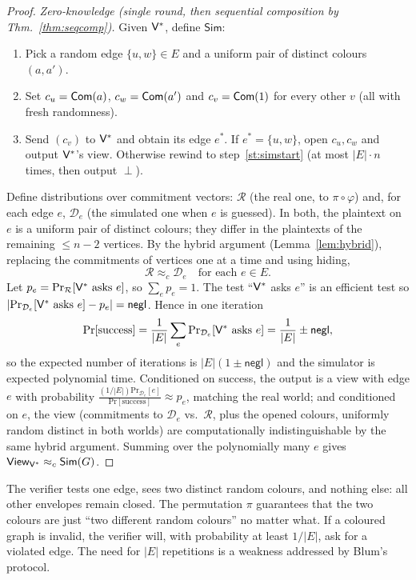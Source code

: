 \documentclass[11pt,a4paper]{report}
\theoremstyle{plain}
\theoremstyle{definition}
\theoremstyle{remark}
\newcommand{\negl}{\mathsf{negl}}
\renewcommand{\Pr}{\mathrm{Pr}}
\newcommand{\Sim}{\mathsf{Sim}}\newcommand{\Ext}{\mathsf{Ext}}
\newcommand{\view}{\mathsf{View}}
\begin{document}
\begin{proof}
\emph{Zero-knowledge (single round, then sequential composition by Thm.~\ref{thm:seqcomp}).} Given $\mathsf{V}^*$, define $\Sim$:
\begin{enumerate}
\item\label{st:simstart} Pick a random edge $\{u,w\}\in E$ and a uniform pair of distinct colours $(a,a')$.
\item Set $c_u=\mathsf{Com}(a)$, $c_w=\mathsf{Com}(a')$ and $c_v=\mathsf{Com}(1)$ for every other $v$ (all with fresh randomness).
\item Send $(c_v)$ to $\mathsf{V}^*$ and obtain its edge $e^*$. If $e^*=\{u,w\}$, open $c_u,c_w$ and output $\mathsf{V}^*$'s view. Otherwise rewind to step~\ref{st:simstart} (at most $|E|\cdot n$ times, then output $\perp$).
\end{enumerate}
Define distributions over commitment vectors: $\mathcal R$ (the real one, to $\pi\circ\varphi$) and, for each edge $e$, $\mathcal D_e$ (the simulated one when $e$ is guessed). In both, the plaintext on $e$ is a uniform pair of distinct colours; they differ in the plaintexts of the remaining $\le n-2$ vertices. By the hybrid argument (Lemma~\ref{lem:hybrid}), replacing the commitments of vertices one at a time and using hiding,
\[ \mathcal R\approx_c\mathcal D_e\quad\text{for each }e\in E. \]
Let $p_e=\Pr_{\mathcal R}[\Ver^*\text{ asks }e]$, so $\sum_ep_e=1$. The test ``$\mathsf{V}^*$ asks $e$'' is an efficient test so $|\Pr_{\mathcal D_e}[\Ver^*\text{ asks }e]-p_e|=\negl$. Hence in one iteration
\[
\Pr[\text{success}]=\frac1{|E|}\sum_e\Pr_{\mathcal D_e}[\Ver^*\text{ asks }e]=\frac1{|E|}\pm\negl,
\]
so the expected number of iterations is $|E|(1\pm\negl)$ and the simulator is expected polynomial time. Conditioned on success, the output is a view with edge $e$ with probability $\frac{(1/|E|)\Pr_{\mathcal D_e}[e]}{\Pr[\text{success}]}\approx p_e$, matching the real world; and conditioned on $e$, the view (commitments to $\mathcal D_e$ vs.\ $\mathcal R$, plus the opened colours, uniformly random distinct in both worlds) are computationally indistinguishable by the same hybrid argument. Summing over the polynomially many $e$ gives $\view_{\Ver^*}\approx_c\Sim(G)$.
\end{proof}
\begin{intuition}
The verifier tests one edge, sees two distinct random colours, and nothing else: all other envelopes remain closed. The permutation $\pi$ guarantees that the two colours are just ``two different random colours'' no matter what. If a coloured graph is invalid, the verifier will, with probability at least $1/|E|$, ask for a violated edge. The need for $|E|$ repetitions is a weakness addressed by Blum's protocol.
\end{intuition}
\end{document}
